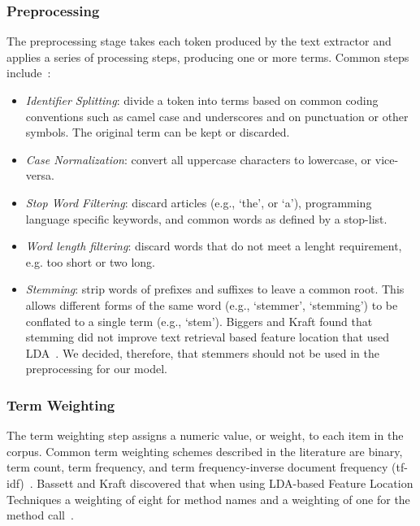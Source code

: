     \subsubsection{Preprocessing}
    The preprocessing stage takes each token produced by the text extractor
    and applies a series of processing steps, producing one or more terms.
    Common steps include~\cite{Marcus-etal:2004, Marcus-Menzies:2010}:
    \begin{itemize}
    \item \textit{Identifier Splitting}:
    divide a token into terms based on common coding conventions
    such as camel case and underscores
    and on punctuation or other symbols.
    The original term can be kept or discarded.
    \item \textit{Case Normalization}:
    convert all uppercase characters to lowercase, or vice-versa.
    \item \textit{Stop Word Filtering}:
    discard articles (e.g., ‘the’, or ‘a’),
    programming language specific keywords,
    and common words as defined by a stop-list.
    \item \textit{Word length filtering}:
    discard words that do not meet a lenght requirement,
    e.g. too short or two long.
    \item \textit{Stemming}:
    strip words of prefixes and suffixes to leave a common root.
    This allows different forms of the same word
    (e.g., ‘stemmer’, ‘stemming’)
    to be conflated to a single term
    (e.g., ‘stem’).
    Biggers and Kraft found that stemming did not improve text retrieval based feature location that used LDA~\cite{Biggers2012}.
    We decided,
    therefore,
    that stemmers should not be used in the preprocessing for our model.
    \end{itemize}

    \subsubsection{Term Weighting}
    The term weighting step assigns a numeric value, or weight, to each item in the corpus.
    Common term weighting schemes described in the literature are
    binary, term count, term frequency, and
    term frequency-inverse document frequency (tf-idf)~\cite{Salton:1988}.
    Bassett and Kraft discovered that when using LDA-based Feature Location Techniques a weighting of eight for method names and a weighting of one for the method call~\cite{Bassett-Kraft:2013}.

